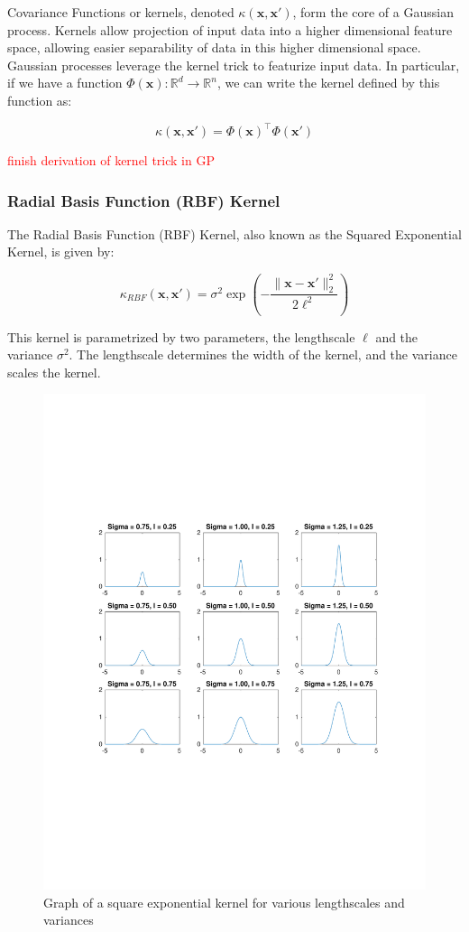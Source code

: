 \documentclass{article}
\newcommand{\R}{\mathbb{R}}
\newcommand{\bx}{\boldsymbol{x}}
\newcommand{\todo}[1]{\textcolor{red}{#1}}
\begin{document}
Covariance Functions or kernels, denoted $\kappa(\bx, \bx')$, form the core of a Gaussian process. Kernels allow
projection of input data into a higher dimensional feature space, allowing easier separability of data in this higher
dimensional space. Gaussian processes leverage the kernel trick to featurize input data. In particular, if we have a
function $\Phi(\bx): \R^d \rightarrow \R^n$, we can write the kernel defined by this function as:

\[
  \kappa(\bx, \bx') = \Phi(\bx)^\top \Phi(\bx')
\]

\todo{finish derivation of kernel trick in GP}

\subsubsection{Radial Basis Function (RBF) Kernel}

The Radial Basis Function (RBF) Kernel, also known as the Squared Exponential Kernel, is given by:

\[
  \kappa_{RBF}(\bx, \bx') = \sigma^2 \exp\left( - \frac{\|\bx -\bx' \|_{2}^{2}}{2 \ell^2} \right)
\]

This kernel is parametrized by two parameters, the lengthscale $\ell$ and the variance $\sigma^2$. The lengthscale
determines the width of the kernel, and the variance scales the kernel\cite{duvenaud_automatic_2014}. 

\begin{figure}[H] \label{fig:square_exp_kernel}
  \caption{Graph of a square exponential kernel for various lengthscales and variances}
  \includegraphics[width=\textwidth]{square_exp_kernel}
\end{figure}
\end{document}
